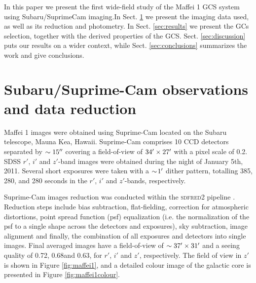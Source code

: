 \documentclass[useAMS,usenatbib]{mn2e}
\begin{document}
In this paper we present the first wide-field study of the Maffei 1
GCS system using Subaru/SuprimeCam imaging.In Sect. \ref{sec:obs} we
present the imaging data used, as well as its reduction and
photometry. In Sect. \ref{sec:results} we present the GCs selection,
together with the derived properties of the
GCS. Sect. \ref{sec:discussion} puts our results on a wider context,
while Sect. \ref{sec:conclusions} summarizes the work and give
conclusions.

\section{Subaru/Suprime-Cam observations and data reduction}
\label{sec:obs}



Maffei 1 images were obtained using Suprime-Cam \citep{miyazaki02}
located on the Subaru telescope, Mauna Kea, Hawaii. Suprime-Cam
comprises 10 CCD detectors separated by $\sim15\hbox{$^{\prime\prime}$}$ covering a
field-of-view of $34\hbox{$^\prime$}\times27\hbox{$^\prime$}$ with a pixel scale of
0.2\arcsec. SDSS $r'$, $i'$ and $z'$-band images were obtained during
the night of January 5th, 2011.  Several short exposures were taken
with a $\sim\!  1\hbox{$^\prime$}$ dither pattern, totalling 385, 280, and 280
seconds in the $r'$, $i'$ and $z'$-bands, respectively.

Suprime-Cam images reduction was conducted within the \textsc{sdfred2}
pipeline \citep{ouchi04}. Reduction steps include bias subtraction,
flat-fielding, correction for atmospheric distortions, point spread
function (psf) equalization (i.e. the normalization of the psf to a
single shape across the detectors and exposures), sky subtraction,
image alignment and finally, the combination of all exposures and
detectors into single images. Final averaged images have a
field-of-view of $\sim37\hbox{$^\prime$}\times 31\hbox{$^\prime$}$ and a seeing quality
of 0.72\arcsec, 0.68\arcsec and 0.63\arcsec, for $r'$, $i'$ and $z'$,
respectively. The field of view in $z'$ is shown in Figure \ref{fig:maffei1}, and a detailed colour image of the galactic core is presented in Figure \ref{fig:maffei1colour}.
\end{document}
